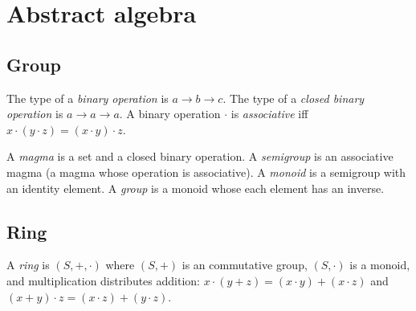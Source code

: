 \chapter{Abstract algebra}

\section{Group}

%
The type of a \emph{binary operation} is \(a \to b \to c\).
%
%
The type of a \emph{closed binary operation} is \(a \to a \to a\).
A binary operation \(\cdot\) is \emph{associative} iff \(x\cdot(y\cdot z) = (x\cdot y)\cdot z\).

%
A \emph{magma} is a set and a closed binary operation.
%
A \emph{semigroup} is an associative magma (a magma whose operation is associative).
%
A \emph{monoid} is a semigroup with an identity element.
%
A \emph{group} is a monoid whose each element has an inverse.

\section{Ring}

A \emph{ring} is \((S,+,\cdot)\) where
\((S,+)\) is an commutative group,
\((S,\cdot)\) is a monoid,
and multiplication distributes addition:
\(x \cdot (y+z) = (x \cdot y) + (x \cdot z)\)
and \((x+y) \cdot z = (x \cdot z) + (y \cdot z)\).
